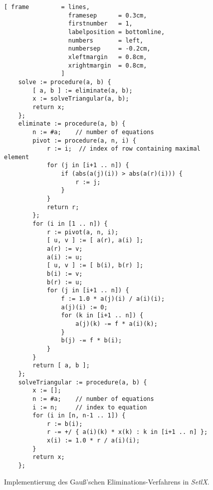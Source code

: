 \begin{figure}[!ht]
\centering
\begin{Verbatim}[ frame         = lines, 
                  framesep      = 0.3cm, 
                  firstnumber   = 1,
                  labelposition = bottomline,
                  numbers       = left,
                  numbersep     = -0.2cm,
                  xleftmargin   = 0.8cm,
                  xrightmargin  = 0.8cm,
                ]
    solve := procedure(a, b) {
        [ a, b ] := eliminate(a, b);
        x := solveTriangular(a, b);
        return x;
    };
    eliminate := procedure(a, b) {
        n := #a;    // number of equations
        pivot := procedure(a, n, i) {
            r := i;  // index of row containing maximal element
            for (j in [i+1 .. n]) {
                if (abs(a(j)(i)) > abs(a(r)(i))) {
                    r := j;
                }
            }
            return r;
        };
        for (i in [1 .. n]) {
            r := pivot(a, n, i);
            [ u, v ] := [ a(r), a(i) ];   
            a(r) := v;
            a(i) := u;
            [ u, v ] := [ b(i), b(r) ];
            b(i) := v;
            b(r) := u;
            for (j in [i+1 .. n]) {
                f := 1.0 * a(j)(i) / a(i)(i);
                a(j)(i) := 0;
                for (k in [i+1 .. n]) {
                    a(j)(k) -= f * a(i)(k);
                }
                b(j) -= f * b(i);
            }    
        }
        return [ a, b ];
    };
    solveTriangular := procedure(a, b) {
        x := [];
        n := #a;    // number of equations
        i := n;     // index to equation
        for (i in [n, n-1 .. 1]) {
            r := b(i);
            r -= +/ { a(i)(k) * x(k) : k in [i+1 .. n] };
            x(i) := 1.0 * r / a(i)(i);
        }
        return x;
    };
\end{Verbatim}
\vspace*{-0.3cm}
\caption{Implementierung des Gauß'schen Eliminations-Verfahrens in \textsl{SetlX}.}
\label{fig:gauss.stlx}
\end{figure}

